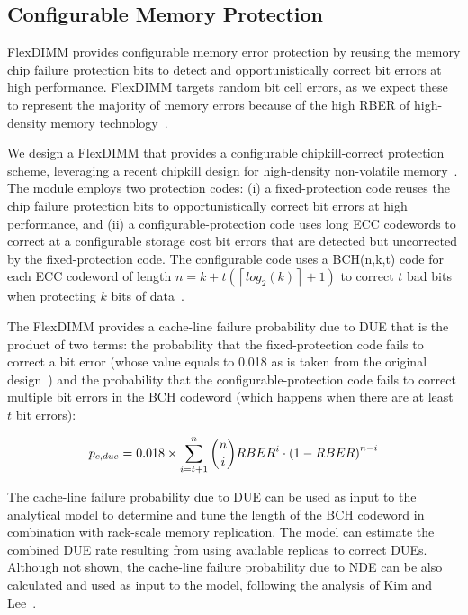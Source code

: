\subsection{Configurable Memory Protection}

FlexDIMM provides configurable memory error protection by reusing the memory chip failure protection bits to detect and opportunistically correct bit errors at high performance.
FlexDIMM targets random bit cell errors, as we expect these to represent the majority of memory errors because of the high RBER of high-density memory technology~\cite{zhang:pm-chipkill:micro:2018, patil:dve:isca:2021}.

We design a FlexDIMM that provides a configurable chipkill-correct protection scheme, leveraging a recent chipkill design for high-density non-volatile memory~\cite{zhang:pm-chipkill:micro:2018}. 
The module employs two protection codes: 
(i) a fixed-protection code reuses the chip failure protection bits to opportunistically correct bit errors at high performance, and 
(ii) a configurable-protection code uses long ECC codewords to correct at a configurable storage cost bit errors that are detected but uncorrected by the fixed-protection code. The configurable code 
uses a BCH(n,k,t) code for each ECC codeword of length $n=k+t(\left \lceil{log_2 (k)} \right \rceil+1)$ to correct $t$ bad bits when protecting $k$ bits of data~\cite{zhang:pm-chipkill:micro:2018}.

The FlexDIMM provides a cache-line failure probability due to DUE that is the product of two terms:
the probability that the fixed-protection code fails to correct a bit error (whose value equals to 0.018 as is taken from the original design~\cite{zhang:pm-chipkill:micro:2018}) and 
the probability that the configurable-protection code fails to correct multiple bit errors in the BCH codeword (which happens when there are at least $t$ bit errors):

\begin{equation*}
{p_{c,due}}= 0.018 \times \sum_{i=t+1}^{n}\binom{n}{i}{RBER}^i\cdot{(1-RBER)}^{n-i}
\end{equation*}

The cache-line failure probability due to DUE can be used as input to the \ramp analytical model to determine and tune the length of the BCH codeword in combination with rack-scale memory replication. 
% 
The model can estimate the combined DUE rate resulting from using available replicas to correct DUEs. 
Although not shown, the cache-line failure probability due to NDE can be also calculated and used as input to the model, following the analysis of Kim and Lee~\cite{kim:undetected-error-bch:ieee-tc:1996}.

